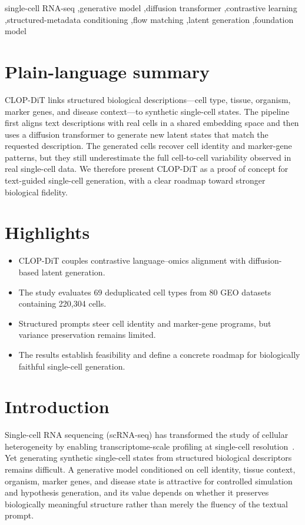 \documentclass[preprint,12pt]{elsarticle}
\begin{document}
\begin{frontmatter}
        \begin{keyword}
        single-cell RNA-seq \sep generative model \sep diffusion transformer \sep contrastive learning \sep structured-metadata conditioning \sep flow matching \sep latent generation \sep foundation model
        \end{keyword}

        \end{frontmatter}

        \section*{Plain-language summary}
        CLOP-DiT links structured biological descriptions—cell type, tissue, organism, marker genes, and disease context—to synthetic single-cell states. The pipeline first aligns text descriptions with real cells in a shared embedding space and then uses a diffusion transformer to generate new latent states that match the requested description. The generated cells recover cell identity and marker-gene patterns, but they still underestimate the full cell-to-cell variability observed in real single-cell data. We therefore present CLOP-DiT as a proof of concept for text-guided single-cell generation, with a clear roadmap toward stronger biological fidelity.

        \section*{Highlights}
\begin{itemize}
\item CLOP-DiT couples contrastive language--omics alignment with diffusion-based latent generation.
\item The study evaluates 69 deduplicated cell types from 80 GEO datasets containing 220,304 cells.
\item Structured prompts steer cell identity and marker-gene programs, but variance preservation remains limited.
\item The results establish feasibility and define a concrete roadmap for biologically faithful single-cell generation.
\end{itemize}

\section{Introduction}

Single-cell RNA sequencing (scRNA-seq) has transformed the study of cellular heterogeneity by enabling transcriptome-scale profiling at single-cell resolution~\cite{ref-scrnaseq-review,ref-10x}. Yet generating synthetic single-cell states from structured biological descriptors remains difficult. A generative model conditioned on cell identity, tissue context, organism, marker genes, and disease state is attractive for controlled simulation and hypothesis generation, and its value depends on whether it preserves biologically meaningful structure rather than merely the fluency of the textual prompt.
\end{document}
